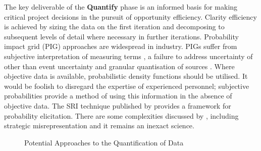 The key deliverable of the \textbf{Quantify} phase is an informed basis for making critical project decisions in the pursuit of opportunity efficiency.
Clarity efficiency is achieved by sizing the data on the first iteration and decomposing to subsequent levels of detail where necessary in further iterations.
Probability impact grid (PIG) approaches are widespread in industry.
PIGs suffer from subjective interpretation of measuring terms \citep{Merkhofer}, a failure to address uncertainty of other than event uncertainty and granular quantisation of sources \citep{Cox2008}.
Where objective data is available, probabilistic density functions should be utilised.
It would be foolish to disregard the expertise of experienced personnel; subjective probabilities provide a method of using this information in the absence of objective data.
The SRI technique published by \citet{spetzer} provides a framework for probability elicitation.
There are some complexities discussed by \citet{Merkhofer}, including strategic misrepresentation \citep{flyvbjerg} and it remains an inexact science.


\begin{figure}[!h]
  \centering
{} \quad
{}
\caption{Potential Approaches to the Quantification of Data}
\label{Figure:PIGPDF}
\end{figure}


